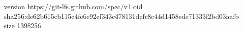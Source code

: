version https://git-lfs.github.com/spec/v1
oid sha256:de62b615cb115c4fe6e92ef343c478131defc8c44d1458ede71333f2bd03aafb
size 1398256
